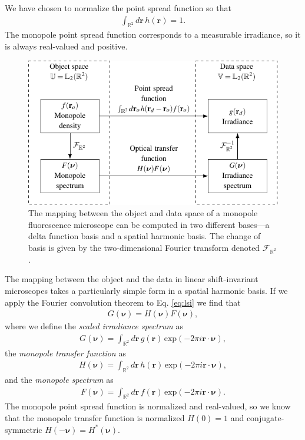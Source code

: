 \documentclass[]{osa-article}
\providecommand{\mb}[1]{\mathbf{#1}}
\providecommand{\mbb}[1]{\mathbb{#1}}
\providecommand{\bs}[1]{\boldsymbol{#1}}
\begin{document}
We have chosen to normalize the point spread function so that
\begin{align}
  \int_{\mbb{R}^2}d\mb{r}\, h(\mb{r}) = 1. \label{eq:norm}
\end{align}
The monopole point spread function corresponds to a measurable irradiance, so it
is always real-valued and positive.

\begin{figure}
  \centering
  \includegraphics[scale=1.0]{../figures/monopole-block/monopole-block.pdf}
  \caption{The mapping between the object and data space of a monopole
    fluorescence microscope can be computed in two different bases---a delta
    function basis and a spatial harmonic basis. The change of basis is given by
    the two-dimensional Fourier transform denoted $\mathcal{F}_{\mbb{R}^2}$.}
     \label{fig:monopole-block}      
\end{figure}

The mapping between the object and the data in linear shift-invariant
microscopes takes a particularly simple form in a spatial harmonic basis. If we
apply the Fourier convolution theorem to Eq. \ref{eq:lsi} we find that
\begin{align}
  G(\bs{\nu}) = H(\bs{\nu})F(\bs{\nu}),\label{eq:freq}
\end{align}
where we define the \textit{scaled irradiance spectrum} as
\begin{align}
  G(\bs{\nu}) = \int_{\mbb{R}^2}d\mb{r}\, g(\mb{r})\, \text{exp}(-2\pi i\mb{r}\cdot\bs{\nu}),
\end{align}
the \textit{monopole transfer function} as
\begin{align}
  H(\bs{\nu}) = \int_{\mbb{R}^2}d\mb{r}\, h(\mb{r})\, \text{exp}(-2\pi i\mb{r}\cdot\bs{\nu}),\label{eq:otf}
\end{align}
and the \textit{monopole spectrum} as
\begin{align}
    F(\bs{\nu}) = \int_{\mbb{R}^2}d\mb{r}\, f(\mb{r})\, \text{exp}(-2\pi i\mb{r}\cdot\bs{\nu}).
\end{align}
The monopole point spread function is normalized and real-valued, so we know
that the monopole transfer function is normalized $H(0) = 1$ and
conjugate-symmetric $H(-\bs{\nu}) = H^*(\bs{\nu})$.
\end{document}
